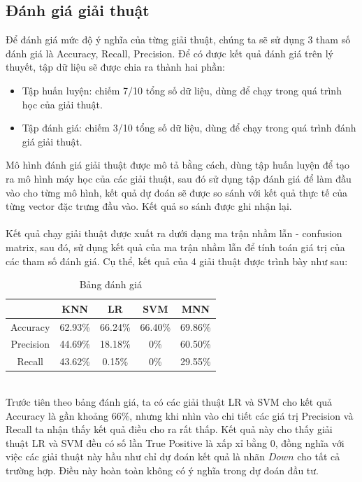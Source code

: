 \subsection{Đánh giá giải thuật}
Để đánh giá mức độ ý nghĩa của từng giải thuật, chúng ta sẽ sử dụng 3 tham số 
đánh giá là Accuracy, Recall, Precision. Để có được kết quả đánh giá trên lý 
thuyết, tập dữ liệu sẽ được chia ra thành hai phần:
\begin{itemize}
\item Tập huấn luyện: chiếm 7/10 tổng số dữ liệu, dùng để chạy trong quá trình 
học của giải thuật.
\item Tập đánh giá: chiếm 3/10 tổng số dữ liệu, dùng để chạy trong quá trình 
đánh giá giải thuật.
\end{itemize}
Mô hình đánh giá giải thuật được mô tả bằng cách, dùng tập huấn luyện để tạo 
ra mô hình máy học của các giải thuật, sau đó sử dụng tập đánh giá để làm đầu 
vào cho từng mô hình, kết quả dự đoán sẽ được so sánh với kết quả thực tế của 
từng vector đặc trưng đầu vào. Kết quả so sánh được ghi nhận lại.\\\\
Kết quả chạy giải thuật được xuất ra dưới dạng ma trận nhầm lẫn - confusion 
matrix, sau đó, sử dụng kết quả của ma trận nhầm lẫn để tính toán giá trị của 
các tham số đánh giá. Cụ thể, kết quả của 4 giải thuật được trình bày như sau:
\begin{table}[h]
\centering
\begin{tabular}{ |c|c|c|c|c| }
\hline
 & KNN & LR & SVM & MNN \\
\hline
Accuracy & 62.93\% & 66.24\% & 66.40\% & 69.86\% \\
\hline
Precision & 44.69\% & 18.18\% & 0\% & 60.50\% \\
\hline
Recall & 43.62\% & 0.15\% & 0\% & 29.55\% \\
\hline
\end{tabular}
\caption{Bảng đánh giá}
\end{table}\\
Trước tiên theo bảng đánh giá, ta có các giải thuật LR và SVM cho kết quả Accuracy
là gần khoảng 66\%, nhưng khi nhìn vào chi tiết các giá trị Precision và Recall 
ta nhận thấy kết quả điều cho ra rất thấp. Kết quả này cho thấy giải thuật LR 
và SVM đều có số lần True Positive là xấp xỉ bằng 0, đồng nghĩa với việc các 
giải thuật này hầu như chỉ dự đoán kết quả là nhãn $Down$ cho tất cả trường hợp. 
Điều này hoàn toàn không có ý nghĩa trong dự đoán đầu tư.\\\\
